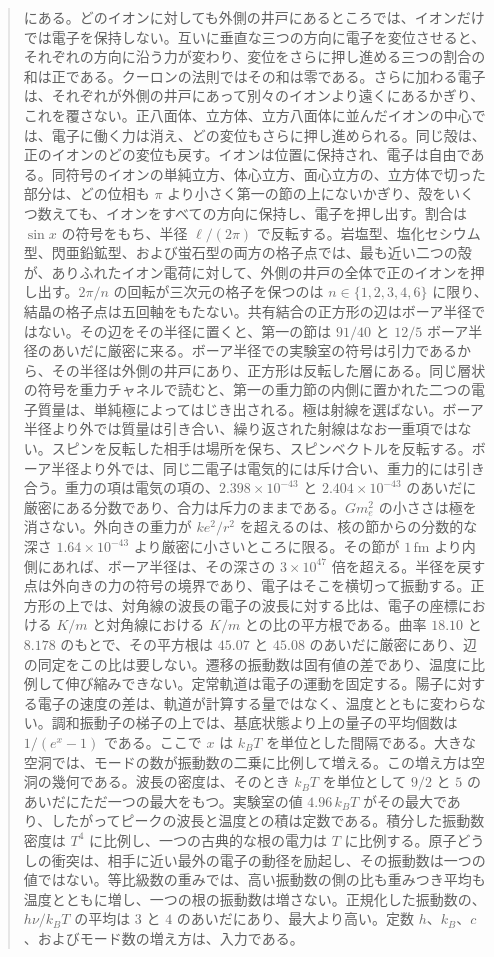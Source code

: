 \documentclass[a4paper]{article}
\begin{document}
\begin{abstract}
にある。どのイオンに対しても外側の井戸にあるところでは、イオンだけでは電子を保持しない。互いに垂直な三つの方向に電子を変位させると、それぞれの方向に沿う力が変わり、変位をさらに押し進める三つの割合の和は正である。クーロンの法則ではその和は零である。さらに加わる電子は、それぞれが外側の井戸にあって別々のイオンより遠くにあるかぎり、これを覆さない。正八面体、立方体、立方八面体に並んだイオンの中心では、電子に働く力は消え、どの変位もさらに押し進められる。同じ殻は、正のイオンのどの変位も戻す。イオンは位置に保持され、電子は自由である。同符号のイオンの単純立方、体心立方、面心立方の、立方体で切った部分は、どの位相も \(\pi\) より小さく第一の節の上にないかぎり、殻をいくつ数えても、イオンをすべての方向に保持し、電子を押し出す。割合は \(\sin x\) の符号をもち、半径 \(\ell/(2\pi)\) で反転する。岩塩型、塩化セシウム型、閃亜鉛鉱型、および蛍石型の両方の格子点では、最も近い二つの殻が、ありふれたイオン電荷に対して、外側の井戸の全体で正のイオンを押し出す。\(2\pi/n\) の回転が三次元の格子を保つのは \(n\in\{1,2,3,4,6\}\) に限り、結晶の格子点は五回軸をもたない。共有結合の正方形の辺はボーア半径ではない。その辺をその半径に置くと、第一の節は \(91/40\) と \(12/5\) ボーア半径のあいだに厳密に来る。ボーア半径での実験室の符号は引力であるから、その半径は外側の井戸にあり、正方形は反転した層にある。同じ層状の符号を重力チャネルで読むと、第一の重力節の内側に置かれた二つの電子質量は、単純極によってはじき出される。極は射線を選ばない。ボーア半径より外では質量は引き合い、繰り返された射線はなお一重項ではない。スピンを反転した相手は場所を保ち、スピンベクトルを反転する。ボーア半径より外では、同じ二電子は電気的には斥け合い、重力的には引き合う。重力の項は電気の項の、\(2.398\times 10^{-43}\) と \(2.404\times 10^{-43}\) のあいだに厳密にある分数であり、合力は斥力のままである。\(G m_e^{2}\) の小ささは極を消さない。外向きの重力が \(k e^{2}/r^{2}\) を超えるのは、核の節からの分数的な深さ \(1.64\times 10^{-43}\) より厳密に小さいところに限る。その節が \(1\,\mathrm{fm}\) より内側にあれば、ボーア半径は、その深さの \(3\times 10^{47}\) 倍を超える。半径を戻す点は外向きの力の符号の境界であり、電子はそこを横切って振動する。正方形の上では、対角線の波長の電子の波長に対する比は、電子の座標における \(K/m\) と対角線における \(K/m\) との比の平方根である。曲率 \(18.10\) と \(8.178\) のもとで、その平方根は \(45.07\) と \(45.08\) のあいだに厳密にあり、辺の同定をこの比は要しない。遷移の振動数は固有値の差であり、温度に比例して伸び縮みできない。定常軌道は電子の運動を固定する。陽子に対する電子の速度の差は、軌道が計算する量ではなく、温度とともに変わらない。調和振動子の梯子の上では、基底状態より上の量子の平均個数は \(1/(e^{x}-1)\) である。ここで \(x\) は \(k_B T\) を単位とした間隔である。大きな空洞では、モードの数が振動数の二乗に比例して増える。この増え方は空洞の幾何である。波長の密度は、そのとき \(k_B T\) を単位として \(9/2\) と \(5\) のあいだにただ一つの最大をもつ。実験室の値 \(4.96\,k_B T\) がその最大であり、したがってピークの波長と温度との積は定数である。積分した振動数密度は \(T^{4}\) に比例し、一つの古典的な根の電力は \(T\) に比例する。原子どうしの衝突は、相手に近い最外の電子の動径を励起し、その振動数は一つの値ではない。等比級数の重みでは、高い振動数の側の比も重みつき平均も温度とともに増し、一つの根の振動数は増さない。正規化した振動数の、\(h\nu/k_B T\) の平均は \(3\) と \(4\) のあいだにあり、最大より高い。定数 \(h\)、\(k_B\)、\(c\)、およびモード数の増え方は、入力である。

\end{abstract}
\end{document}
